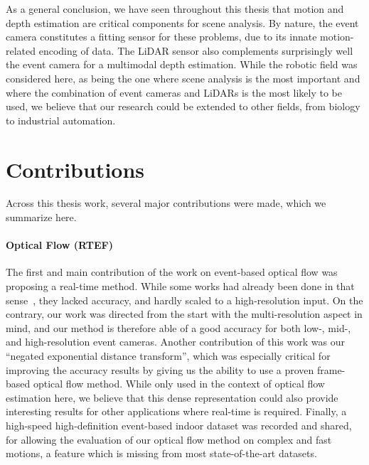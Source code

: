 As a general conclusion, we have seen throughout this thesis that motion and depth estimation are critical components for scene analysis. By nature, the event camera constitutes a fitting sensor for these problems, due to its innate motion-related encoding of data. The LiDAR sensor also complements surprisingly well the event camera for a multimodal depth estimation. While the robotic field was considered here, as being the one where scene analysis is the most important and where the combination of event cameras and LiDARs is the most likely to be used, we believe that our research could be extended to other fields, from biology to industrial automation.


\section{Contributions}
Across this thesis work, several major contributions were made, which we summarize here.

\paragraph{Optical Flow (RTEF)}
The first and main contribution of the work on event-based optical flow was proposing a real-time method. While some works had already been done in that sense~\cite{ParedesValls2021BackTE,Akolkar2020SeeBY}, they lacked accuracy, and hardly scaled to a high-resolution input. On the contrary, our work was directed from the start with the multi-resolution aspect in mind, and our method is therefore able of a good accuracy for both low-, mid-, and high-resolution event cameras. Another contribution of this work was our ``negated exponential distance transform'', which was especially critical for improving the accuracy results by giving us the ability to use a proven frame-based optical flow method. While only used in the context of optical flow estimation here, we believe that this dense representation could also provide interesting results for other applications where real-time is required. Finally, a high-speed high-definition event-based indoor dataset was recorded and shared, for allowing the evaluation of our optical flow method on complex and fast motions, a feature which is missing from most state-of-the-art datasets.

